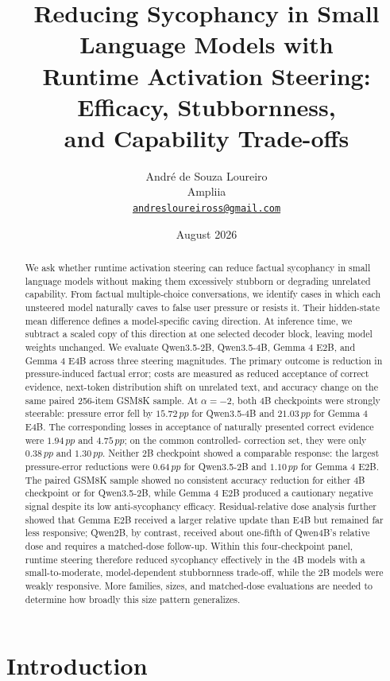 \documentclass[11pt]{article}
\title{Reducing Sycophancy in Small Language Models with\\
Runtime Activation Steering: Efficacy, Stubbornness,\\
and Capability Trade-offs}
\author{Andr\'e de Souza Loureiro\\
Ampliia\\
\href{mailto:andresloureiross@gmail.com}{\texttt{andresloureiross@gmail.com}}}
\date{August 2026}
\newcommand{\pp}{\,pp}
\begin{document}
\maketitle

\begin{abstract}
We ask whether runtime activation steering can reduce factual sycophancy in
small language models without making them excessively stubborn or degrading
unrelated capability. From factual multiple-choice conversations, we identify
cases in which each unsteered model naturally caves to false user pressure or
resists it. Their hidden-state mean difference defines a model-specific caving
direction. At inference time, we subtract a scaled copy of this direction at
one selected decoder block, leaving model weights unchanged. We evaluate
Qwen3.5-2B, Qwen3.5-4B, Gemma 4 E2B, and Gemma 4 E4B across three steering
magnitudes. The primary outcome is reduction in pressure-induced factual error;
costs are measured as reduced acceptance of correct evidence, next-token
distribution shift on unrelated text, and accuracy change on the same paired
256-item GSM8K sample. At $\alpha=-2$, both 4B checkpoints were strongly
steerable: pressure error fell by $15.72\pp$ for Qwen3.5-4B and $21.03\pp$ for
Gemma 4 E4B. The corresponding losses in acceptance of naturally presented
correct evidence were $1.94\pp$ and $4.75\pp$; on the common controlled-
correction set, they were only $0.38\pp$ and $1.30\pp$. Neither 2B checkpoint
showed a comparable response: the largest pressure-error reductions were
$0.64\pp$ for Qwen3.5-2B and $1.10\pp$ for Gemma 4 E2B. The paired GSM8K sample
showed no consistent accuracy reduction for either 4B checkpoint or for
Qwen3.5-2B, while Gemma 4 E2B produced a cautionary negative signal despite its
low anti-sycophancy efficacy. Residual-relative dose analysis further showed
that Gemma E2B received a larger relative update than E4B but remained far less
responsive; Qwen2B, by contrast, received about one-fifth of Qwen4B's relative
dose and requires a matched-dose follow-up. Within this four-checkpoint panel,
runtime steering therefore reduced sycophancy effectively in the 4B models with
a small-to-moderate, model-dependent stubbornness trade-off, while the 2B models
were weakly responsive. More families, sizes, and matched-dose evaluations are
needed to determine how broadly this size pattern generalizes.
\end{abstract}

\section{Introduction}
\label{sec:introduction}
\end{document}
